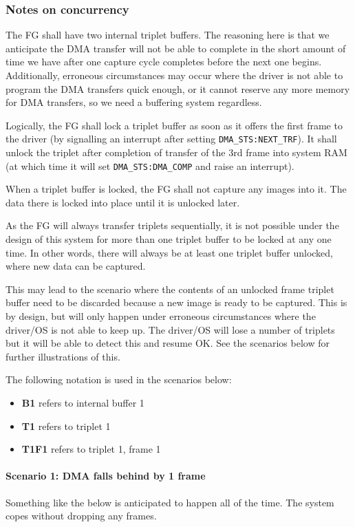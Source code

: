 \documentclass[12pt]{article}
\begin{document}
\subsubsection{Notes on concurrency}

The FG shall have two internal triplet buffers. The reasoning here is that we anticipate the DMA transfer will not be able to complete in the short amount of time we have after one capture cycle completes before the next one begins. Additionally, erroneous circumstances may occur where the driver is not able to program the DMA transfers quick enough, or it cannot reserve any more memory for DMA transfers, so we need a buffering system regardless.

Logically, the FG shall lock a triplet buffer as soon as it offers the first frame to the driver (by signalling an interrupt after setting \texttt{DMA\_STS:NEXT\_TRF}). It shall unlock the triplet after completion of transfer of the 3rd frame into system RAM (at which time it will set \texttt{DMA\_STS:DMA\_COMP} and raise an interrupt).

When a triplet buffer is locked, the FG shall not capture any images into it. The data there is locked into place until it is unlocked later.

As the FG will always transfer triplets sequentially, it is not possible under the design of this system for more than one triplet buffer to be locked at any one time. In other words, there will always be at least one triplet buffer unlocked, where new data can be captured.

This may lead to the scenario where the contents of an unlocked frame triplet buffer need to be discarded because a new image is ready to be captured. This is by design, but will only happen under erroneous circumstances where the driver/OS is not able to keep up. The driver/OS will lose a number of triplets but it will be able to detect this and resume OK. See the scenarios below for further illustrations of this.

The following notation is used in the scenarios below:

\begin{itemize}
\item \textbf{B1} refers to internal buffer 1
\item \textbf{T1} refers to triplet 1
\item \textbf{T1F1} refers to triplet 1, frame 1
\end{itemize}

\paragraph{Scenario 1: DMA falls behind by 1 frame}
Something like the below is anticipated to happen all of the time. The system copes without dropping any frames.
\end{document}
